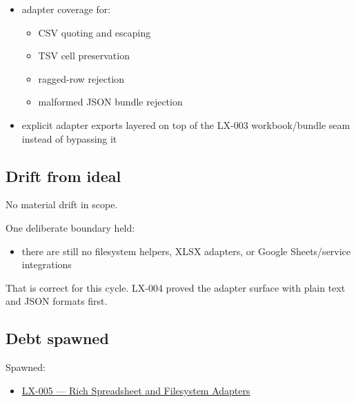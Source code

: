 \begin{itemize}
  \begin{itemize}
  \tightlist
  \item
    \texttt{p\allowbreak{}a\allowbreak{}c\allowbreak{}k\allowbreak{}a\allowbreak{}g\allowbreak{}e\allowbreak{}s\allowbreak{}/\allowbreak{}b\allowbreak{}i\allowbreak{}j\allowbreak{}o\allowbreak{}u\allowbreak{}-\allowbreak{}i\allowbreak{}1\allowbreak{}8\allowbreak{}n\allowbreak{}-\allowbreak{}t\allowbreak{}o\allowbreak{}o\allowbreak{}l\allowbreak{}s\allowbreak{}/\allowbreak{}s\allowbreak{}r\allowbreak{}c\allowbreak{}/\allowbreak{}a\allowbreak{}d\allowbreak{}a\allowbreak{}p\allowbreak{}t\allowbreak{}e\allowbreak{}r\allowbreak{}s\allowbreak{}.\allowbreak{}t\allowbreak{}e\allowbreak{}s\allowbreak{}t\allowbreak{}.\allowbreak{}t\allowbreak{}s}
  \end{itemize}
\item
  adapter coverage for:

  \begin{itemize}
  \tightlist
  \item
    CSV quoting and escaping
  \item
    TSV cell preservation
  \item
    ragged-row rejection
  \item
    malformed JSON bundle rejection
  \end{itemize}
\item
  explicit adapter exports layered on top of the LX-003 workbook/bundle seam instead of bypassing it
\end{itemize}

\subsection{Drift from ideal}\label{record-191-drift-from-ideal}

No material drift in scope.

One deliberate boundary held:

\begin{itemize}
\tightlist
\item
  there are still no filesystem helpers, XLSX adapters, or Google Sheets/service integrations
\end{itemize}

That is correct for this cycle. LX-004 proved the adapter surface with plain text and JSON formats first.

\subsection{Debt spawned}\label{record-191-debt-spawned}

Spawned:

\begin{itemize}
\tightlist
\item
  \href{https://github.com/flyingrobots/bijou/blob/cbd70612140e7a450d764b3c7be1c6af878b99bc/docs/method/graveyard/legacy-backlog/LX-005-rich-spreadsheet-and-filesystem-adapters.md}{LX-005 --- Rich Spreadsheet and Filesystem Adapters}
\end{itemize}

